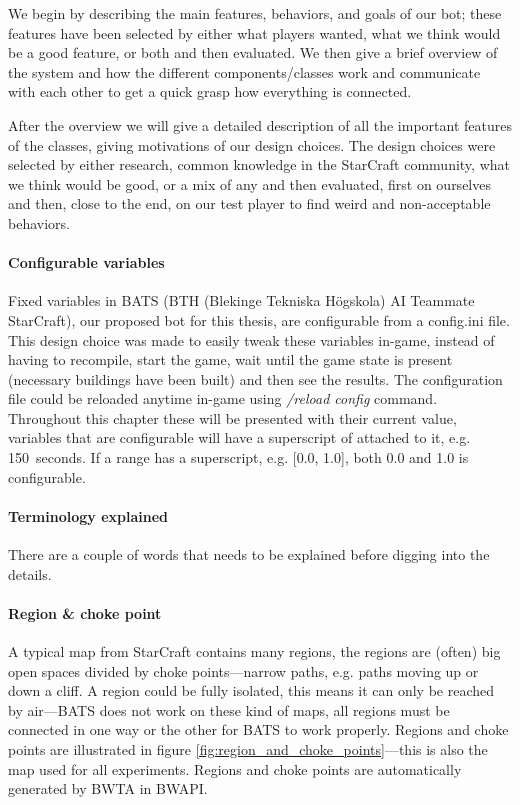 We begin by describing the main features, behaviors, and goals of our bot; these features have been
selected by either what players wanted, what we think would be a good feature, or both and then
evaluated. We then give a brief overview of the system and how the different components/classes work
and communicate with each other to get a quick grasp how everything is connected.

After the overview we will give a detailed description of all the important features of the classes,
giving motivations of our design choices. The design choices were selected by either research,
common knowledge in the StarCraft community, what we think would be good, or a mix of any and then
evaluated, first on ourselves and then, close to the end, on our test player to find weird and
non-acceptable behaviors.

\paragraph{Configurable variables}
Fixed variables in BATS (BTH (Blekinge Tekniska Högskola) AI Teammate StarCraft), our proposed bot
for this thesis, are configurable from a config.ini file. This design choice was made to easily
tweak these variables in-game, instead of having to recompile, start the game, wait until the game
state is present (necessary buildings have been built) and then see the results. The configuration
file could be reloaded anytime in-game using \emph{/reload config} command. Throughout this chapter
these will be presented with their current value, variables that are configurable will have a
superscript of \conf attached to it, e.g. 150\conf~seconds. If a range has a superscript, e.g. [0.0,
1.0]\conf, both 0.0 and 1.0 is configurable.

\paragraph{Terminology explained}
There are a couple of words that needs to be explained before digging into the details.

\paragraph{Region \& choke point} A typical map from StarCraft contains many regions, the regions
are (often) big open spaces divided by choke points—narrow paths, e.g. paths moving up or down a
cliff. A region could be fully isolated, this means it can only be reached by air—BATS does not work
on these kind of maps, all regions must be connected in one way or the other for BATS to work
properly. Regions and choke points are illustrated in figure \ref{fig:region_and_choke_points}—this
is also the map used for all experiments. Regions and choke points are automatically generated by
BWTA\cite{bwta} in BWAPI\cite{bwapi}.
